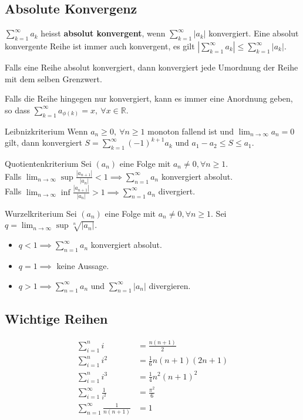 \documentclass[a4paper,10pt]{article}
\def\limn{\lim_{n\to \infty}}
\def\sumk{\sum_{k=1}^\infty}
\def\R{\mathbb{R}}
\begin{document}
\subsection{Absolute Konvergenz}
$\sumk a_k$ heisst \textbf{absolut konvergent}, wenn $\sumk |a_k|$ konvergiert. Eine absolut konvergente Reihe ist immer auch konvergent, es gilt $|\sumk a_k| \le \sumk |a_k|$.

Falls eine Reihe absolut konvergiert, dann konvergiert jede Umordnung der Reihe mit dem selben Grenzwert.

Falls die Reihe hingegen nur konvergiert, kann es immer eine Anordnung geben, so dass $\sum_{k=1}^\infty a_{\phi(k)} = x, \ \forall x\in \R$.

\begin{subbox}{Leibnizkriterium}
Wenn $a_n \ge 0, \ \forall n \ge 1$ monoton fallend ist und $\limn a_n = 0$ gilt, dann konvergiert $S = \sumk (-1)^{k+1} a_k$ und $a_1 - a_2 \le S \le a_1$.
\end{subbox}

\begin{mainbox}{Quotientenkriterium}
Sei $(a_n)$ eine Folge mit $a_n \ne 0, \forall n \ge 1$. \\ Falls $\limn \sup \frac{|a_{n+1}|}{|a_n|} < 1 \implies \sum_{n=1}^\infty a_n$ konvergiert absolut. \\Falls $\limn \inf \frac{|a_{n+1}|}{|a_n|} > 1 \implies \sum_{n=1}^\infty a_n$ divergiert.  
\end{mainbox}

\begin{mainbox}{Wurzelkriterium}
Sei $(a_n)$ eine Folge mit $a_n \ne 0, \forall n \ge 1$. Sei $q = \limn \sup \sqrt[n]{|a_n|}$. 
\begin{itemize}
 \item $q < 1 \implies \sum_{n=1}^\infty a_n$ konvergiert absolut.
 \item $q = 1 \implies$ keine Aussage.
 \item $q > 1 \implies \sum_{n=1}^\infty a_n$ und $\sum_{n=1}^\infty |a_n|$ divergieren.
\end{itemize}
\end{mainbox}

\subsection{Wichtige Reihen}
\begin{align*}
 \sum_{i=1}^n i &= \frac{n(n+1)}{2} \\
 \sum_{i=1}^n i^2 &= \frac{1}{6}n(n+1)(2n+1) \\
 \sum_{i=1}^n i^3 &= \frac{1}{4}n^2(n+1)^2 \\
 \sum_{i=1}^\infty \frac{1}{i^2} &= \frac{\pi^2}{6} \\
 \sum_{n=1}^\infty \frac{1}{n(n+1)} &= 1
\end{align*}
\end{document}
